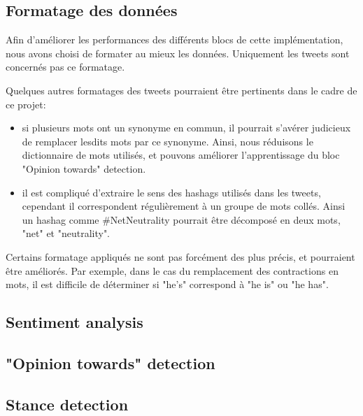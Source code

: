 \subsection{Formatage des données}
\par Afin d'améliorer les performances des différents blocs de cette implémentation, nous avons choisi de formater au mieux les données. Uniquement les tweets sont concernés pas ce formatage.


\par Quelques autres formatages des tweets pourraient être pertinents dans le cadre de ce projet:
\begin{itemize}
  \item si plusieurs mots ont un synonyme en commun, il pourrait s'avérer judicieux de remplacer lesdits mots par ce synonyme. Ainsi, nous réduisons le dictionnaire de mots utilisés, et pouvons améliorer l'apprentissage du bloc "Opinion towards" detection.
  \item il est compliqué d'extraire le sens des hashags utilisés dans les tweets, cependant il correspondent régulièrement à un groupe de mots collés. Ainsi un hashag comme \#NetNeutrality pourrait être décomposé en deux mots, "net" et "neutrality".
\end{itemize}
Certains formatage appliqués ne sont pas forcément des plus précis, et pourraient être améliorés. Par exemple, dans le cas du remplacement des contractions en mots, il est difficile de déterminer si "he's" correspond à "he is" ou "he has".

\subsection{Sentiment analysis}

\subsection{"Opinion towards" detection}

\subsection{Stance detection}
